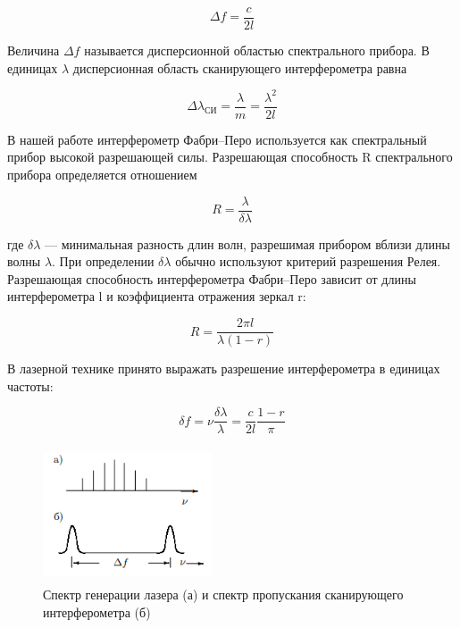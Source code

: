 \documentclass[12pt,a4paper]{article}
\begin{document}
\begin{equation}
\Delta{f}=\frac{c}{2l}
\end{equation}

\par Величина $\Delta{f}$ называется дисперсионной областью спектрального прибора. В единицах $\lambda$ дисперсионная область сканирующего интерферометра равна

\begin{equation}
\Delta\lambda_{\text{СИ}} = \frac{\lambda}{m} = \frac{\lambda^2}{2l}
\end{equation}

\par В нашей работе интерферометр Фабри–Перо используется как спектральный прибор высокой разрешающей силы. Разрешающая способность R спектрального прибора определяется отношением

\begin{equation}
R = \frac{\lambda}{\delta\lambda}
\end{equation}

где $\delta\lambda$ — минимальная разность длин волн, разрешимая прибором вблизи длины волны $\lambda$. При определении $\delta\lambda$ обычно используют критерий разрешения Релея. Разрешающая способность интерферометра Фабри–Перо зависит от длины интерферометра l и коэффициента отражения зеркал r:

\begin{equation}
R = \frac{2\pi{l}}{\lambda(1-r)}
\end{equation}

В лазерной технике принято выражать разрешение интерферометра в единицах частоты:

\begin{equation}
\delta{f} = \nu\frac{\delta\lambda}{\lambda} = \frac{c}{2l}\frac{1-r}{\pi}
\end{equation}

\begin{figure}
	\vspace{-4ex}
	\includegraphics[width=5cm, height=4cm]{4.5.3-3}
	\caption{Спектр генерации лазера (а) и спектр пропускания сканирующего интерферометра (б)}
\end{figure}	 
\end{document}
